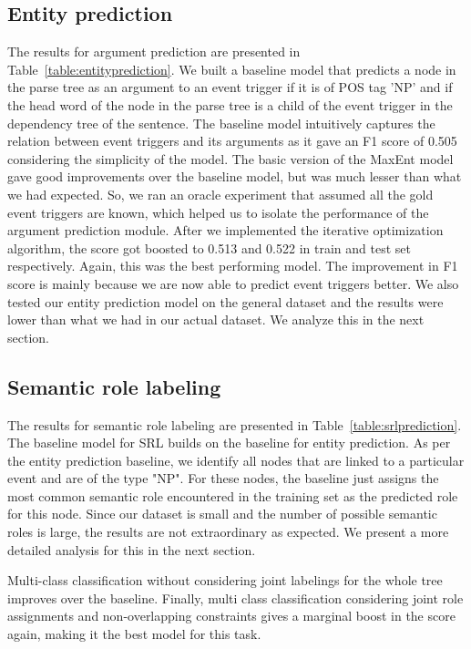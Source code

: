 \subsection{Entity prediction}
The results for argument prediction are presented in Table~\ref{table:entityprediction}. We built a baseline model that predicts a node in the parse tree as an argument to an event trigger if it is of POS tag 'NP' and if the head word of the node in the parse tree is a child of the event trigger in the dependency tree of the sentence. The baseline model intuitively captures the relation between event triggers and its arguments as it gave an F1 score of 0.505 considering the simplicity of the model. The basic version of the MaxEnt model gave good improvements over the baseline model, but was much lesser than what we had expected. So, we ran an oracle experiment that assumed all the gold event triggers are known, which helped us to isolate the performance of the argument prediction module. After we implemented the iterative optimization algorithm, the score got boosted to 0.513 and 0.522 in train and test set respectively. Again, this was the best performing model. The improvement in F1 score is mainly because we are now able to predict event triggers better. We also tested our entity prediction model on the general dataset and the results were lower than what we had in our actual dataset. We analyze this in the next section.

\subsection{Semantic role labeling}
The results for semantic role labeling are presented in Table~\ref{table:srlprediction}. The baseline model for SRL builds on the baseline for entity prediction. As per the entity prediction baseline, we identify all nodes that are linked to a particular event and are of the type "NP".  For these nodes, the baseline just assigns the most common semantic role encountered in the training set as the predicted role for this node. Since our dataset is small and the number of possible semantic roles is large, the results are not extraordinary as expected. We present a more detailed analysis for this in the next section.

Multi-class classification without considering joint labelings for the whole tree improves over the baseline. Finally, multi class classification considering joint role assignments and non-overlapping constraints gives a marginal boost in the score again, making it the best model for this task.